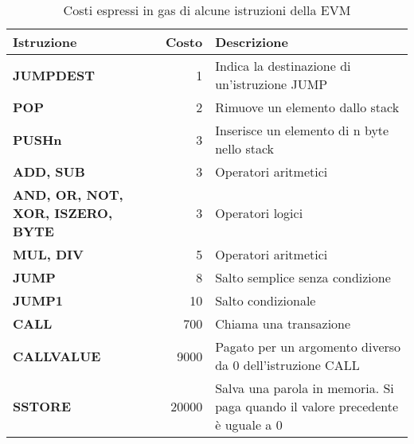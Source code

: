 \begin{table}[h]                        %
\begin{center}  %

\begin{tabular}{p{5cm}rp{6cm}}  

\hline \hline   %
Istruzione & Costo & Descrizione\\   %
\hline  %
\bf JUMPDEST & 1 & Indica la destinazione di un'istruzione JUMP\\
\bf POP & 2 & Rimuove un elemento dallo stack\\
\bf PUSHn & 3 & Inserisce un elemento di n byte nello stack\\
\bf ADD, SUB & 3 & Operatori aritmetici\\
\bf AND, OR, NOT, XOR, ISZERO, BYTE & 3 & Operatori logici\\
\bf MUL, DIV & 5 & Operatori aritmetici\\
\bf JUMP & 8 & Salto semplice senza condizione\\
\bf JUMP1 & 10 & Salto condizionale\\
\hline
\bf CALL & 700 & Chiama una transazione\\
\bf CALLVALUE & 9000 & Pagato per un argomento diverso da 0 dell'istruzione CALL\\
\bf SSTORE & 20000 & Salva una parola in memoria. Si paga quando il valore precedente è uguale a 0\\
\hline \hline
\end{tabular}

\caption[legenda elenco tabelle]{Costi espressi in gas di alcune istruzioni della EVM}\label{tab:gas-costs}
\end{center}
\end{table}

